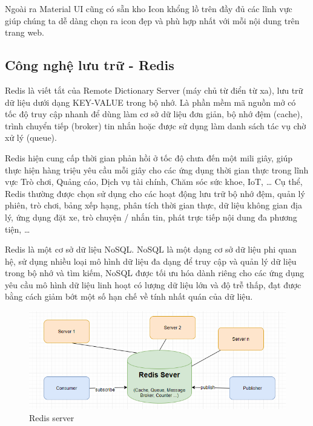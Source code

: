Ngoài ra Material UI cũng có sẵn kho Icon khổng lồ trên đầy
đủ các lĩnh vực giúp chúng ta dễ dàng chọn ra icon đẹp và
phù hợp nhất với mỗi nội dung trên trang web.

\subsection{Công nghệ lưu trữ - Redis}
Redis là viết tắt của Remote Dictionary Server
(máy chủ từ điển từ xa), lưu trữ dữ liệu dưới dạng
KEY-VALUE trong bộ nhớ. Là phần mềm mã nguồn mở có tốc độ
truy cập nhanh để dùng làm cơ sở dữ liệu đơn giản, bộ nhớ đệm (cache),
trình chuyển tiếp (broker) tin nhắn hoặc
được sử dụng làm danh sách tác vụ chờ xử lý (queue). 

Redis hiện cung cấp thời gian phản hồi ở tốc độ chưa đến
một mili giây, giúp thực hiện hàng triệu yêu cầu mỗi giây cho
các ứng dụng thời gian thực trong lĩnh vực Trò chơi, Quảng cáo, Dịch
vụ tài chính, Chăm sóc sức khoe, IoT, … Cụ thể, Redis thường được chọn
sử dụng cho các hoạt động lưu trữ bộ nhớ đệm, quản lý phiên, trò chơi,
bảng xếp hạng, phân tích thời gian thực, dữ liệu không gian
địa lý, ứng dụng đặt xe, trò chuyện / nhắn tin, phát trực tiếp
nội dung đa phương tiện, …

Redis là một cơ sở dữ liệu NoSQL. NoSQL là một dạng cơ sở dữ liệu
phi quan hệ, sử dụng nhiều loại mô hình dữ liệu đa dạng để
truy cập và quản lý dữ liệu trong bộ nhớ và tìm kiếm, NoSQL được
tối ưu hóa dành riêng cho các ứng dụng yêu cầu mô hình dữ liệu
linh hoạt có lượng dữ liệu lớn và độ trễ thấp, đạt được bằng cách
giảm bớt một số hạn chế về tính nhất quán của dữ liệu.

\begin{figure}[H]
    \centering
    \includegraphics[width=14cm]{images/redis.png}
    \caption{Redis server}
\end{figure}

